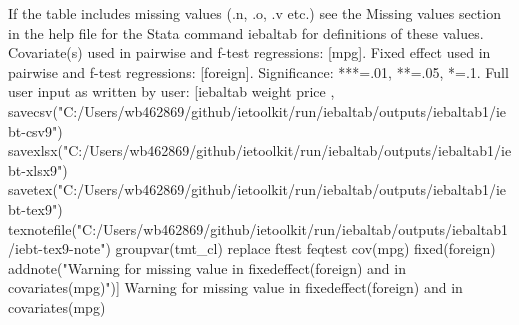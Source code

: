 If the table includes missing values (.n, .o, .v etc.) see the Missing values section in the help file for the Stata command iebaltab for definitions of these values. Covariate(s) used in pairwise and f-test regressions: [mpg]. Fixed effect used in pairwise and f-test regressions: [foreign]. Significance: ***=.01, **=.05, *=.1. Full user input as written by user: [iebaltab weight price , savecsv("C:/Users/wb462869/github/ietoolkit/run/iebaltab/outputs/iebaltab1/iebt-csv9") savexlsx("C:/Users/wb462869/github/ietoolkit/run/iebaltab/outputs/iebaltab1/iebt-xlsx9") savetex("C:/Users/wb462869/github/ietoolkit/run/iebaltab/outputs/iebaltab1/iebt-tex9") texnotefile("C:/Users/wb462869/github/ietoolkit/run/iebaltab/outputs/iebaltab1/iebt-tex9-note") groupvar(tmt\_cl) replace ftest feqtest cov(mpg) fixed(foreign) addnote("Warning for missing value in fixedeffect(foreign) and in covariates(mpg)")] Warning for missing value in fixedeffect(foreign) and in covariates(mpg)
